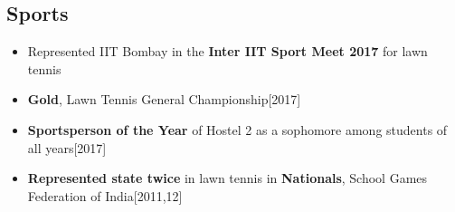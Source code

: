 \documentclass{article}
\begin{document}
\subsection*{\large Sports}
\vspace{-6pt}
\begin{itemize}[itemsep = -0.7 mm, leftmargin=*]
	\item Represented IIT Bombay in the \textbf{Inter IIT Sport Meet 2017} for lawn tennis
	\item \textbf{Gold}, Lawn Tennis General Championship\hfill{[2017]}
	\item \textbf{Sportsperson of the Year} of Hostel 2 as a sophomore among students of all years\hfill{[2017]}
	\item \textbf{Represented state twice} in lawn tennis in \textbf{Nationals}, School Games Federation of India\hfill{[2011,12]}
\end{itemize}
\vspace{-15pt}
\end{document}
